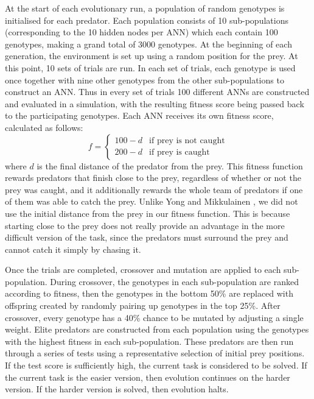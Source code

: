 \documentclass[12pt]{article} %
\begin{document}
At the start of each evolutionary run, a population of random genotypes is initialised for each predator. Each population consists of 10 sub-populations (corresponding to the 10 hidden nodes per ANN) which each contain 100 genotypes, making a grand total of 3000 genotypes. At the beginning of each generation, the environment is set up using a random position for the prey. At this point, 10 sets of trials are run. In each set of trials, each genotype is used once together with nine other genotypes from the other sub-populations to construct an ANN. Thus in every set of trials 100 different ANNs are constructed and evaluated in a simulation, with the resulting fitness score being passed back to the participating genotypes. Each ANN receives its own fitness score, calculated as follows:
\[
f = 
\begin{cases}
100-d& \text{if prey is not caught}\\
200-d& \text{if prey is caught}
\end{cases}
\]
where $d$ is the final distance of the predator from the prey. This fitness function rewards predators that finish close to the prey, regardless of whether or not the prey was caught, and it additionally rewards the whole team of predators if one of them was able to catch the prey. Unlike Yong and Mikkulainen \cite{Yong2001}, we did not use the initial distance from the prey in our fitness function. This is because starting close to the prey does not really provide an advantage in the more difficult version of the task, since the predators must surround the prey and cannot catch it simply by chasing it.

Once the trials are completed, crossover and mutation are applied to each sub-population. During crossover, the genotypes in each sub-population are ranked according to fitness, then the genotypes in the bottom 50\% are replaced with offspring created by randomly pairing up genotypes in the top 25\%. After crossover, every genotype has a 40\% chance to be mutated by adjusting a single weight. Elite predators are constructed from each population using the genotypes with the highest fitness in each sub-population. These predators are then run through a series of tests using a representative selection of initial prey positions. If the test score is sufficiently high, the current task is considered to be solved. If the current task is the easier version, then evolution continues on the harder version. If the harder version is solved, then evolution halts.
\end{document}
